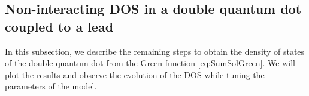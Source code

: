 


\subsection{Non-interacting DOS in a  double quantum dot coupled to a lead \label{sec:GreedDQD}}


In this subsection, we describe the remaining steps to obtain the density of states of the double quantum dot from the Green function \eqref{eq:SumSolGreen}. We will plot the results and observe the evolution of the DOS while tuning the parameters of the model. 

